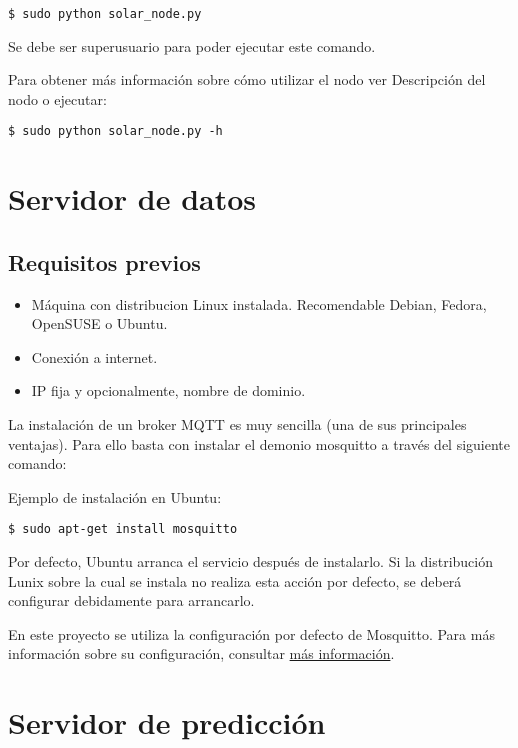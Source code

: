 \lstset{language=bash}
\begin{lstlisting}[frame=single]
$ sudo python solar_node.py
\end{lstlisting}

Se debe ser superusuario para poder ejecutar este comando.

Para obtener más información sobre cómo utilizar el nodo ver Descripción del nodo o ejecutar:

\lstset{language=bash}
\begin{lstlisting}[frame=single]
$ sudo python solar_node.py -h
\end{lstlisting}

\section{Servidor de datos}
\label{makereference8.2}
\subsection{Requisitos previos}
\label{makereference8.3}
\begin{itemize}
\item Máquina con distribucion Linux instalada. Recomendable Debian, Fedora, OpenSUSE o Ubuntu.
\item Conexión a internet.
\item IP fija y opcionalmente, nombre de dominio.
\end{itemize}

La instalación de un broker MQTT es muy sencilla (una de sus principales ventajas). Para ello basta con instalar el demonio mosquitto a través del siguiente comando:

Ejemplo de instalación en Ubuntu:
\lstset{language=bash}
\begin{lstlisting}[frame=single]
$ sudo apt-get install mosquitto
\end{lstlisting}

Por defecto, Ubuntu arranca el servicio después de instalarlo. Si la distribución Lunix sobre la cual se instala no realiza esta acción por defecto, se deberá configurar debidamente para arrancarlo.

En este proyecto se utiliza la configuración por defecto de Mosquitto. Para más información sobre su configuración, consultar \href{https://www.digitalocean.com/community/tutorials/how-to-install-and-secure-the-mosquitto-mqtt-messaging-broker-on-ubuntu-16-04}{más información}.

\section{Servidor de predicción}
\label{makereference8.4}

